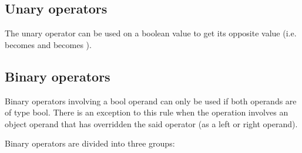 \subsection{Unary operators}
\label{sec:orgb412ce4}

The unary operator \token{!} can be used on a boolean value to get its opposite
value (i.e.  becomes  and  becomes
).

\subsection{Binary operators}
\label{sec:org030ae50}

Binary operators involving a bool operand can only be used if both operands are
of type bool. There is an exception to this rule when the operation involves an
object operand that has overridden the said operator (as a left or right
operand).

Binary operators are divided into three groups:

